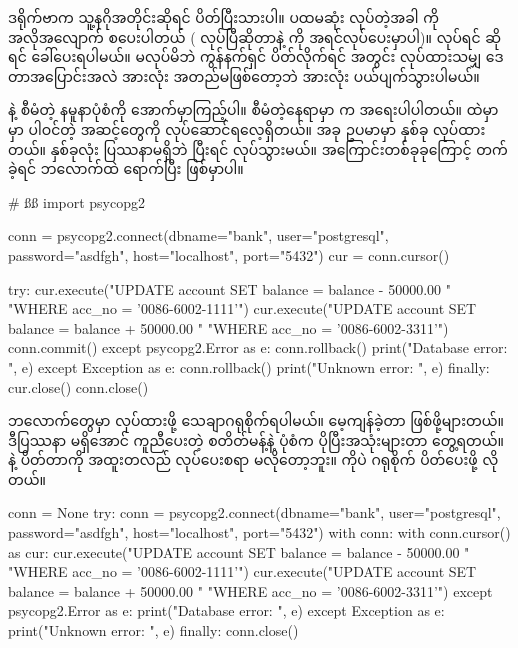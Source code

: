  ဒရိုက်ဗာက သူ့နဂိုအတိုင်းဆိုရင်  ပိတ်ပြီးသားပါ။ ပထမဆုံး  လုပ်တဲ့အခါ  ကို အလိုအလျောက် စပေးပါတယ် ( လုပ်ပြီဆိုတာနဲ့  ကို အရင်လုပ်ပေးမှာပါ)။  လုပ်ရင် \fEn{,}  ဆိုရင်  ခေါ်ပေးရပါမယ်။  မလုပ်မိဘဲ ကွန်နက်ရှင် ပိတ်လိုက်ရင်  အတွင်း လုပ်ထားသမျှ ဒေတာအပြောင်းအလဲ အားလုံး အတည်မဖြစ်တော့ဘဲ အားလုံး ပယ်ပျက်သွားပါမယ်။ 

 နဲ့  စီမံတဲ့ နမူနာပုံစံကို အောက်မှာကြည့်ပါ။  စီမံတဲ့နေရာမှာ  က အရေးပါပါတယ်။  ထဲမှာ  မှာ ပါဝင်တဲ့ အဆင့်တွေကို လုပ်ဆောင်ရလေ့ရှိတယ်။ အခု ဥပမာမှာ  နှစ်ခု လုပ်ထားတယ်။ နှစ်ခုလုံး ပြဿနာမရှိဘဲ ပြီးရင်  လုပ်သွားမယ်။ အကြောင်းတစ်ခုခုကြောင့်  တက်ခဲ့ရင်  ဘလောက်ထဲ ရောက်ပြီး  ဖြစ်မှာပါ။
%
\begin{py}
# ßß
import psycopg2

conn = psycopg2.connect(dbname="bank", user="postgresql", 
                        password="asdfgh", host="localhost", port="5432")
cur = conn.cursor()

try:
    cur.execute("UPDATE account SET balance = balance - 50000.00 "
                "WHERE acc_no = '0086-6002-1111'")
    cur.execute("UPDATE account SET balance = balance + 50000.00 "
                "WHERE acc_no = '0086-6002-3311'")
    conn.commit()
except psycopg2.Error as e:
    conn.rollback()
    print("Database error: ", e)
except Exception as e:
    conn.rollback()
    print("Unknown error: ", e)
finally:
    cur.close()
    conn.close()
\end{py}
%
 ဘလောက်တွေမှာ  လုပ်ထားဖို့ သေချာဂရုစိုက်ရပါမယ်။ မေ့ကျန်ခဲ့တာ ဖြစ်ဖို့များတယ်။ ဒီပြဿနာ မရှိအောင် ကူညီပေးတဲ့  စတိတ်မန့်နဲ့ ပုံစံက ပိုပြီးအသုံးများတာ တွေ့ရတယ်။  နဲ့  ပိတ်တာကို အထူးတလည် လုပ်ပေးစရာ မလိုတော့ဘူး။  ကိုပဲ ဂရုစိုက် ပိတ်ပေးဖို့ လိုတယ်။

%
\begin{py}
conn = None
try:
    conn = psycopg2.connect(dbname="bank", user="postgresql", 
                            password="asdfgh", host="localhost", port="5432")
    with conn:
        with conn.cursor() as cur:
            cur.execute("UPDATE account SET balance = balance - 50000.00 "
                        "WHERE acc_no = '0086-6002-1111'")
            cur.execute("UPDATE account SET balance = balance + 50000.00 "
                        "WHERE acc_no = '0086-6002-3311'")
except psycopg2.Error as e:
    print("Database error: ", e)
except Exception as e:
    print("Unknown error: ", e)
finally:
    conn.close()
\end{py}
%


